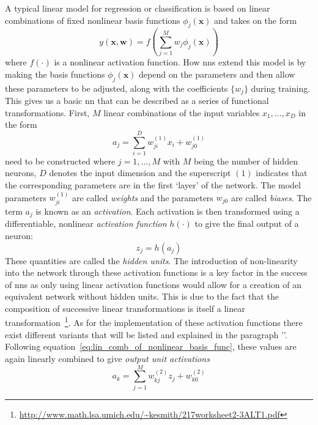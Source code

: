 A typical linear model for regression or classification is based on linear combinations of fixed nonlinear basis functions $ \phi_j (\pmb{x}) $ and takes on the form
\begin{equation}
	\label{eq:lin_comb_of_nonlinear_basis_func}
	y(\pmb{x}, \pmb{w}) = f \left( \sum_{j=1}^{M} w_j \phi_j (\pmb{x}) \right)
\end{equation}
where $ f(\cdot) $ is a nonlinear activation function. How \gls{nn}s extend this model is by making the basis functions $ \phi_j(\pmb{x}) $ depend on the parameters and then allow these parameters to be adjusted, along with the coefficients $  \{w_j\} $ during training. This gives us a basic \gls{nn} that can be described as a series of functional transformations. First, $ M $ linear combinations of the input variables $ x_1, \dots, x_D $ in the form
\begin{equation}
	a_j = \sum_{i=1}^{D} w_{ji}^{(1)} x_i + w_{j0}^{(1)}
\end{equation}
need to be constructed where $ j = 1, \dots, M $ with $ M $ being the number of hidden neurons, $ D $ denotes the input dimension and the superscript $ (1) $ indicates that the corresponding parameters are in the first `layer' of the network. The model parameters $ w_{ji}^{(1)} $ are called \textit{weights} and the parameters $ w_{j0} $ are called \textit{biases}. The term $ a_j $ is known as an \textit{activation}. Each activation is then transformed using a differentiable, nonlinear \textit{activation function} $ h (\cdot) $ to give the final output of a neuron:
\begin{equation}
	z_j = h(a_j)
\end{equation}
These quantities are called the \textit{hidden units}. The introduction of non-linearity into the network through these activation functions is a key factor in the success of \gls{nn}s as only using linear activation functions would allow for a creation of an equivalent network without hidden units. This is due to the fact that the composition of successive linear transformations is itself a linear transformation~\footnote{\url{http://www.math.lsa.umich.edu/~kesmith/217worksheet2-3ALT1.pdf}}. As for the implementation of these activation functions there exist different variants that will be listed and explained in the paragraph ''. Following equation~\ref{eq:lin_comb_of_nonlinear_basis_func}, these values are again linearly combined to give \textit{output unit activations}
\begin{equation}
	\label{eq:output_unit_activation}
	a_k = \sum_{j=1}^{M} w_{kj}^{(2)} z_j + w_{k0}^{(2)}
\end{equation}
